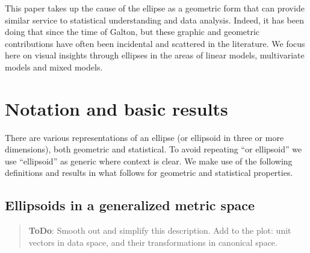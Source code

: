 \documentclass[11pt]{article}%
\newcommand*{\todo}[1]{\marginpar{ToDo:\small{#1}}}
\newcommand{\TODO}[1]{\begin{quotation}\color{blue}\textbf{ToDo}: #1\end{quotation}}
\newcommand*{\mat}[1]{\ensuremath{\bm{#1}}}
\begin{document}
This paper  takes up  the cause  of the  ellipse as  a geometric  form that  can
provide similar service to statistical understanding and data analysis.  Indeed,
it has been doing that since the time of Galton, but these graphic and geometric
contributions have often  been incidental and  scattered in the  literature.  We
focus here on visual  insights through ellipses in  the areas of linear  models,
multivariate models and mixed models.

\section{Notation and basic results}
There are various representations of an ellipse (or ellipsoid in three or more dimensions),
both geometric and statistical.  
To avoid repeating ``or ellipsoid'' we use ``ellipsoid'' as generic where context is clear. 
We make use of the following definitions and results in what follows for geometric and
statistical properties.





\subsection{Ellipsoids in a generalized metric space}
\TODO{
Smooth out and simplify this description.
Add to the plot: unit vectors in data space, and their transformations in canonical space.
}
\end{document}
